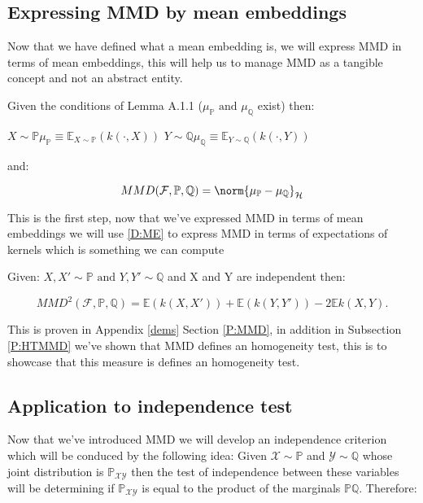 \subsection{Expressing MMD by mean embeddings}
Now that we have defined what a mean embedding is, we will express MMD in terms of  mean embeddings, this will help us to manage MMD as a tangible concept and not an abstract entity.

Given the conditions of Lemma A.1.1 ($\mu_{\mathbb{P}} \text{ and } \mu_{\mathbb{Q}}$ exist) then:

$X \sim \mathbb{P} \mu_{\mathbb{P}} \equiv \mathbb{E}_{X\sim \mathbb{P}}(k(\cdot,X))$ $Y \sim \mathbb{Q} \mu_{\mathbb{Q}} \equiv \mathbb{E}_{Y\sim \mathbb{Q}}(k(\cdot,Y))$

and:

$$MMD(\mathcal{F},\mathbb{P}, \mathbb{Q}) = \norm{\mu_{\mathbb{P}} - \mu_{\mathbb{Q}}}_{\mathcal{H}}$$

This is the first step, now that we've expressed MMD in terms of mean embeddings we will use \ref{D:ME} to express MMD in terms of expectations of kernels which is something we can compute

\begin{prop}
Given:
$X,X' \sim \mathbb{P} \text{ and } Y,Y' \sim \mathbb{Q}$ and X and Y are independent then:

$$MMD^{2}(\mathcal{F},\mathbb{P},\mathbb{Q}) = \mathbb{E}(k(X,X')) + \mathbb{E}(k(Y,Y')) - 2\mathbb{E}k(X,Y).$$

\end{prop}

This is proven in Appendix \ref{dems} Section \ref{P:MMD}, in addition in Subsection \ref{P:HTMMD} we've shown that MMD defines an homogeneity test, this is to showcase that this measure is defines an homogeneity test.

\subsection{Application to independence test}

Now that we've introduced MMD we will develop an independence criterion which will be conduced by the following idea:
Given $\mathcal{X} \sim \mathbb{P}$ and $\mathcal{Y} \sim \mathbb{Q}$ whose joint distribution is $\mathbb{P}_{\mathcal{XY}}$ then the test of independence between these variables will be determining if $\mathbb{P}_{\mathcal{XY}}$ is equal to the product of the marginals $\mathbb{P}\mathbb{Q}$. Therefore:

